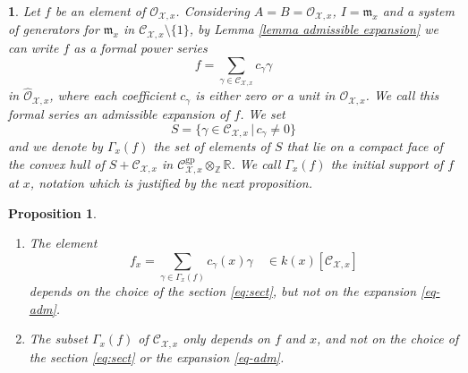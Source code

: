 \documentclass{amsart}%
\numberwithin{equation}{subsection}
\theoremstyle{plain2}
\newtheorem{prop}[equation]{Proposition}
\theoremstyle{definition2}
\theoremstyle{stepstyle}
\theoremstyle{point}
\theoremstyle{subpoint}
\newtheorem{subpoint}[equation]{}%
\newcommand{\spa}[1]{\begin{subpoint}#1\end{subpoint}}           %
\newcommand{\Z}{\ensuremath{\mathbb{Z}}}
\newcommand{\R}{\ensuremath{\mathbb{R}}}
\newcommand{\cX}{\ensuremath{\mathscr{X}}}
\newcommand{\caC}{\ensuremath{\mathcal{C}}}
\newcommand{\caO}{\ensuremath{\mathcal{O}}}
\renewcommand{\R}{\ensuremath{\mathbb{R}}}
\newcommand{\gp}{\mathrm{gp}}
\begin{document}
\spa{ \label{paragr admissible expansion}Let $f$ be an element of $\mathcal{O}_{\cX,x}$. Considering $A=B=\caO_{\cX,x}$, $I=\mathfrak{m}_x$ and a system of generators for $\mathfrak{m}_x$ in $\caC_{\cX,x} \setminus \{1\}$, by Lemma \ref{lemma admissible expansion} we can write $f$ as a formal power series
\begin{equation}\label{eq-adm}
f=\sum_{\gamma \in \mathcal{C}_{\cX,x}}c_{\gamma}\gamma
\end{equation}
 in
$\widehat{\mathcal{O}}_{\cX,x}$, where each coefficient $c_\gamma$
 is either zero or a unit in $\mathcal{O}_{\cX,x}$. We call this formal series an \textit{admissible expansion} of $f$. We set
 \begin{equation}\label{equ def S}
S=\{\gamma\in\mathcal{C}_{\cX,x}\,|\,c_\gamma\neq 0\}
 \end{equation} and we denote by $\Gamma_x(f)$ the set of elements of $S$ that lie on a compact face of the convex hull of $S+ \mathcal{C}_{\cX,x}$ in $\mathcal{C}^{\gp}_{\cX,x}\otimes_{\Z}\R$. We call $\Gamma_x(f)$ the {\em initial support} of $f$ at $x$, notation which is justified by the next proposition.}
\begin{prop}\label{prop-init}\item
\begin{enumerate}
\item \label{it:indep1} The element
$$f_x=\sum_{\gamma\in\Gamma_x(f)}c_\gamma(x) \gamma\quad \in k(x)[\mathcal{C}_{\cX,x}]$$ depends on the choice of the section \eqref{eq:sect}, but not on the expansion \eqref{eq-adm}. \item \label{it:indep2} The subset $\Gamma_x(f)$ of $\mathcal{C}_{\cX,x}$ only depends on $f$ and $x$, and not on the choice of the section \eqref{eq:sect} or the expansion \eqref{eq-adm}.
\end{enumerate}
\end{prop}
\end{document}
